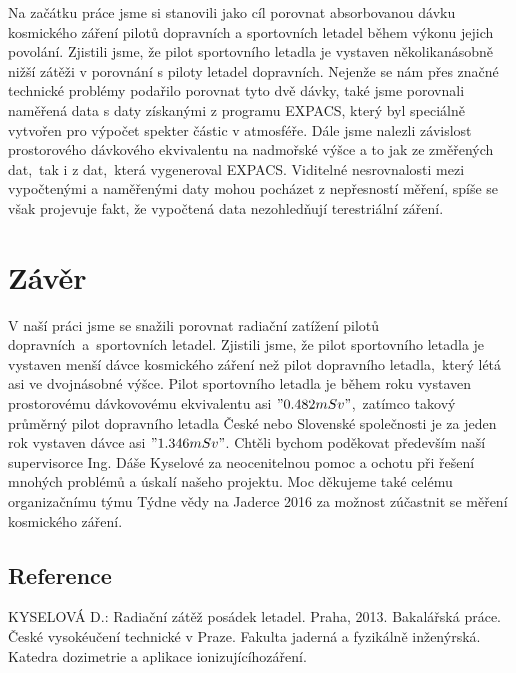 \documentclass[11pt,a4paper]{article}
\begin{document}
\begin{center}
\end{center}
Na začátku práce jsme si stanovili jako cíl porovnat absorbovanou dávku
kosmického záření pilotů dopravních a sportovních letadel během výkonu jejich
povolání. Zjistili jsme, že pilot sportovního letadla je vystaven
několikanásobně nižší zátěži v porovnání s piloty letadel dopravních. Nejenže se
nám přes značné technické problémy podařilo porovnat tyto dvě dávky, také jsme
porovnali naměřená data s daty získanými z programu EXPACS, který byl speciálně
vytvořen pro výpočet spekter částic v atmosféře. Dále jsme nalezli závislost
prostorového dávkového ekvivalentu na nadmořské výšce a to jak ze změřených
dat,~tak i z dat,~která vygeneroval EXPACS. Viditelné nesrovnalosti mezi
vypočtenými a naměřenými daty mohou pocházet z nepřesností měření, spíše se
však projevuje fakt, že vypočtená data nezohledňují terestriální záření.\newpage

\section*{Závěr}
V naší práci jsme se snažili porovnat radiační zatížení pilotů
dopravních~a~sportovních letadel. Zjistili jsme, že pilot sportovního letadla je
vystaven menší dávce kosmického záření než pilot dopravního letadla,~který létá
asi ve dvojnásobné výšce. Pilot sportovního letadla je během roku vystaven
prostorovému dávkovovému ekvivalentu asi $"0.482 mSv" $,~zatímco takový průměrný
pilot dopravního letadla České nebo Slovenské společnosti je za jeden rok
vystaven dávce asi $"1.346 mSv"$.
Chtěli bychom poděkovat především naší supervisorce Ing. Dáše Kyselové za
neocenitelnou pomoc a ochotu při řešení mnohých problémů a úskalí našeho
projektu. Moc děkujeme také celému organizačnímu týmu Týdne vědy na Jaderce
2016 za možnost zúčastnit se měření kosmického záření.
\subsection*{Reference}
\begin{thebibliography}{99}
KYSELOVÁ D.: Radiační zátěž posádek letadel. Praha, 2013. Bakalářská práce. České vysokéučení technické v Praze. Fakulta jaderná a fyzikálně inženýrská. Katedra dozimetrie a aplikace ionizujícíhozáření.
\end{thebibliography}
\end{document}
